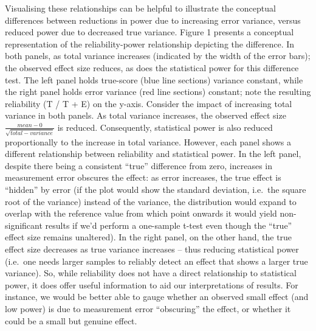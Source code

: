 \documentclass[english,,man,floatsintext]{apa6}
\begin{document}
Visualising these relationships can be helpful to illustrate the conceptual differences between reductions in power due to increasing error variance, versus reduced power due to decreased true variance. Figure 1 presents a conceptual representation of the reliability-power relationship depicting the difference. In both panels, as total variance increases (indicated by the width of the error bars); the observed effect size reduces, as does the statistical power for this difference test. The left panel holds true-score (blue line sections) variance constant, while the right panel holds error variance (red line sections) constant; note the resulting reliability (T / T + E) on the y-axis. Consider the impact of increasing total variance in both panels. As total variance increases, the observed effect size \(\frac{mean - 0}{\sqrt{total-variance}}\) is reduced. Consequently, statistical power is also reduced proportionally to the increase in total variance. However, each panel shows a different relationship between reliability and statistical power. In the left panel, despite there being a consistent \enquote{true} difference from zero, increases in measurement error obscures the effect: as error increases, the true effect is \enquote{hidden} by error (if the plot would show the standard deviation, i.e.~the square root of the variance) instead of the variance, the distribution would expand to overlap with the reference value from which point onwards it would yield non-significant results if we'd perform a one-sample t-test even though the \enquote{true} effect size remains unaltered). In the right panel, on the other hand, the true effect size decreases as true variance increases -- thus reducing statistical power (i.e.~one needs larger samples to reliably detect an effect that shows a larger true variance). So, while reliability does not have a direct relationship to statistical power, it does offer useful information to aid our interpretations of results. For instance, we would be better able to gauge whether an observed small effect (and low power) is due to measurement error \enquote{obscuring} the effect, or whether it could be a small but genuine effect.
\end{document}
